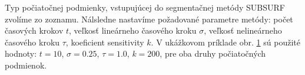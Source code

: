 \documentclass[a4paper,11pt,oneside]{article}%
\begin{document}
Typ počiatočnej podmienky, vstupujúcej do segmentačnej metódy SUBSURF zvolíme zo zoznamu. Nálsledne nastavíme požadované parametre metódy: počet časových krokov $t$, veľkosť lineárneho časového kroku $\sigma$, veľkosť nelineárneho časového kroku $\tau$, koeficient sensitivity $k$. V ukážkovom príklade obr. \ref{fig:res_subsurf} sú použité hodnoty: $t = 10$, $\sigma = 0.25$, $\tau = 1.0$, $k = 200$, pre oba druhy počiatočných podmienok. 


\begin{figure}[H]%
    \centering
    \qquad
    \caption{}%
    \label{fig:res_subsurf}%
\end{figure}
\end{document}
